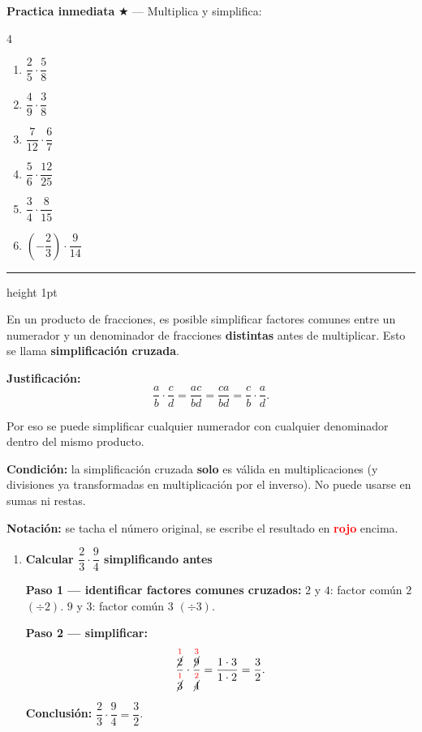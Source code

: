 \documentclass[11pt, letterpaper]{article}
\newcommand{\subbloque}[1]{%
  \vspace{14pt}
  \noindent{\large\bfseries\color{zenitnavy} #1}\par
  \vspace{4pt}\hrule height 1pt\vspace{8pt}}
\begin{document}
\medskip
\textbf{Practica inmediata} \quad $\bigstar$ --- Multiplica y simplifica:
\begin{multicols}{4}
\begin{enumerate}[label=\alph*), leftmargin=*]
  \item $\dfrac{2}{5}\cdot\dfrac{5}{8}$ \item $\dfrac{4}{9}\cdot\dfrac{3}{8}$
  \item $\dfrac{7}{12}\cdot\dfrac{6}{7}$ \item $\dfrac{5}{6}\cdot\dfrac{12}{25}$
  \item $\dfrac{3}{4}\cdot\dfrac{8}{15}$ \item $\left(-\dfrac{2}{3}\right)\cdot\dfrac{9}{14}$
\end{enumerate}
\end{multicols}

\subbloque{5.5 Simplificaci\'on cruzada}
\label{sub:5.5}

\begin{tcolorbox}[importantbox, title={Definici\'on y condici\'on de uso}]
En un producto de fracciones, es posible simplificar factores comunes entre un numerador y un denominador de fracciones \textbf{distintas} antes de multiplicar. Esto se llama \textbf{simplificaci\'on cruzada}.

\medskip
\noindent\textbf{Justificaci\'on:}
$$\frac{a}{b}\cdot\frac{c}{d}=\frac{ac}{bd}=\frac{ca}{bd}=\frac{c}{b}\cdot\frac{a}{d}.$$

Por eso se puede simplificar cualquier numerador con cualquier denominador dentro del mismo producto.

\medskip
\noindent\textbf{Condici\'on:} la simplificaci\'on cruzada \textbf{solo} es v\'alida en multiplicaciones (y divisiones ya transformadas en multiplicaci\'on por el inverso). No puede usarse en sumas ni restas.

\medskip
\noindent\textbf{Notaci\'on:} se tacha el n\'umero original, se escribe el resultado en \textcolor{red}{\textbf{rojo}} encima.
\end{tcolorbox}

\begin{tcolorbox}[examplebox, title={Ejemplo --- Multiplicaci\'on con simplificaci\'on cruzada}]
\begin{enumerate}[label=\textbf{Ej. \arabic*.}, leftmargin=*, itemsep=14pt]

\item \textbf{Calcular $\dfrac{2}{3}\cdot\dfrac{9}{4}$ simplificando antes}

\textbf{Paso 1 --- identificar factores comunes cruzados:}
$2$ y $4$: factor com\'un $2$ $(\div2)$. $9$ y $3$: factor com\'un $3$ $(\div3)$.

\medskip
\textbf{Paso 2 --- simplificar:}
$$\frac{\overset{\textcolor{red}{1}}{\cancel{2}}}{\overset{\textcolor{red}{1}}{\cancel{3}}}\cdot\frac{\overset{\textcolor{red}{3}}{\cancel{9}}}{\overset{\textcolor{red}{2}}{\cancel{4}}}=\frac{1\cdot3}{1\cdot2}=\frac{3}{2}.$$

\medskip
\textbf{Conclusi\'on:} $\dfrac{2}{3}\cdot\dfrac{9}{4}=\dfrac{3}{2}$.

\end{enumerate}
\end{tcolorbox}
\end{document}

